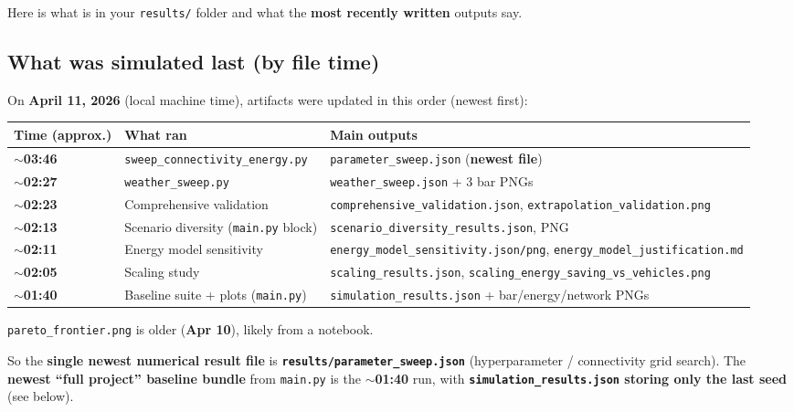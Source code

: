 \documentclass[11pt,a4paper]{article}
\begin{document}
\begin{assistmsg}
Here is what is in your \texttt{results/} folder and what the \textbf{most recently written} outputs say.

\subsection*{What was simulated last (by file time)}

On \textbf{April 11, 2026} (local machine time), artifacts were updated in this order (newest first):

\begin{center}
\begin{tabular}{@{}p{2.6cm}p{4.2cm}p{7.5cm}@{}}
\toprule
\textbf{Time (approx.)} & \textbf{What ran} & \textbf{Main outputs} \\
\midrule
\textbf{$\sim$03:46} & \texttt{sweep\_connectivity\_energy.py} & \texttt{parameter\_sweep.json} (\textbf{newest file}) \\
\textbf{$\sim$02:27} & \texttt{weather\_sweep.py} & \texttt{weather\_sweep.json} + 3 bar PNGs \\
\textbf{$\sim$02:23} & Comprehensive validation & \texttt{comprehensive\_validation.json}, \texttt{extrapolation\_validation.png} \\
\textbf{$\sim$02:13} & Scenario diversity (\texttt{main.py} block) & \texttt{scenario\_diversity\_results.json}, PNG \\
\textbf{$\sim$02:11} & Energy model sensitivity & \texttt{energy\_model\_sensitivity.json/png}, \texttt{energy\_model\_justification.md} \\
\textbf{$\sim$02:05} & Scaling study & \texttt{scaling\_results.json}, \texttt{scaling\_energy\_saving\_vs\_vehicles.png} \\
\textbf{$\sim$01:40} & Baseline suite + plots (\texttt{main.py}) & \texttt{simulation\_results.json} + bar/energy/network PNGs \\
\bottomrule
\end{tabular}
\end{center}

\texttt{pareto\_frontier.png} is older (\textbf{Apr 10}), likely from a notebook.

So the \textbf{single newest numerical result file} is \textbf{\texttt{results/parameter\_sweep.json}} (hyperparameter / connectivity grid search). The \textbf{newest ``full project'' baseline bundle} from \texttt{main.py} is the \textbf{$\sim$01:40} run, with \textbf{\texttt{simulation\_results.json} storing only the last seed} (see below).


\end{assistmsg}
\end{document}
